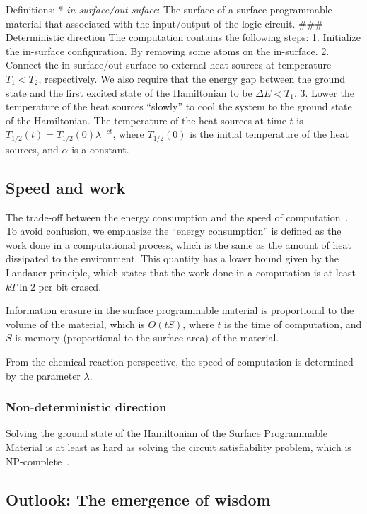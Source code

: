 \documentclass[twocolumn,superscriptaddress,english,showpacs,longbibliography]{revtex4-2}
\begin{document}
Definitions: * \emph{in-surface/out-suface}: The surface of a surface
programmable material that associated with the input/output of the logic
circuit. \#\#\# Deterministic direction The computation contains the
following steps: 1. Initialize the in-surface configuration. By removing
some atoms on the in-surface. 2. Connect the in-surface/out-surface to
external heat sources at temperature $T_1 < T_2$, respectively. We
also require that the energy gap between the ground state and the first
excited state of the Hamiltonian to be $\Delta E< T_1$. 3. Lower the
temperature of the heat sources ``slowly'' to cool the system to the
ground state of the Hamiltonian. The temperature of the heat sources at
time $t$ is $T_{1/2}(t) = T_{1/2}(0)\lambda^{-c t}$, where
$T_{1/2}(0)$ is the initial temperature of the heat sources, and
$\alpha$ is a constant.

\subsection{Speed and work}\label{speed-and-work}

The trade-off between the energy consumption and the speed of
computation~\cite{Feynman2018}. To avoid confusion, we emphasize the
``energy consumption'' is defined as the work done in a computational
process, which is the same as the amount of heat dissipated to the
environment. This quantity has a lower bound given by the Landauer
principle, which states that the work done in a computation is at least
$kT\ln 2$ per bit erased\cite{Reeb2014}.

Information erasure in the surface programmable material is proportional
to the volume of the material, which is $O(tS)$, where $t$ is the
time of computation, and $S$ is memory (proportional to the surface
area) of the material.

From the chemical reaction perspective, the speed of computation is
determined by the parameter $\lambda$.

\subsubsection{Non-deterministic
direction}\label{non-deterministic-direction}

Solving the ground state of the Hamiltonian of the Surface Programmable
Material is at least as hard as solving the circuit satisfiability
problem, which is NP-complete~\cite{Moore2011}.

\subsection{Outlook: The emergence of
wisdom}\label{outlook-the-emergence-of-wisdom}
\end{document}

